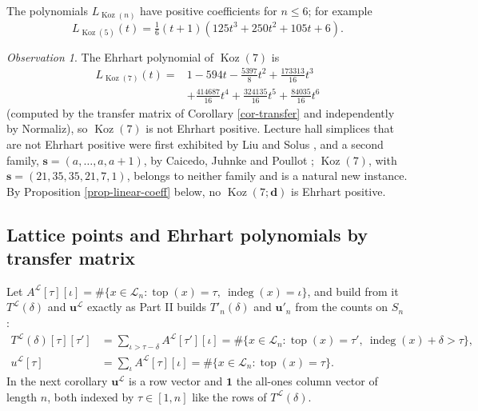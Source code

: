 \documentclass[11pt, a4paper, abstract=yes]{scrartcl}
\theoremstyle{definition}
\theoremstyle{remark}
\theoremstyle{plain}
\newcommand{\vek}[1]{\boldsymbol{#1}}
\theoremstyle{remark}
\newtheorem{observation}[definition]{Observation}
\theoremstyle{plain}
\newcommand{\Koz}{\operatorname{Koz}}
\newcommand{\indeg}{\operatorname{indeg}}
\newcommand{\tp}{\operatorname{top}}
\let\autocite\cite
\begin{document}
The polynomials \(L_{\Koz(n)}\) have positive coefficients for \(n\le6\); for example
\[
  L_{\Koz(5)}(t)=\tfrac16(t+1)(125t^3+250t^2+105t+6).
\]

\begin{observation}
The Ehrhart polynomial of \(\Koz(7)\) is
\begin{equation*}
\begin{split}
  L_{\Koz(7)}(t)={}&1-594t-\tfrac{5397}8t^2+\tfrac{173313}{16}t^3\\
  &+\tfrac{414687}{16}t^4+\tfrac{324135}{16}t^5+\tfrac{84035}{16}t^6
\end{split}
\end{equation*}
(computed by the transfer matrix of Corollary \ref{cor-transfer} and independently by Normaliz), so
\(\Koz(7)\) is not Ehrhart positive. Lecture hall simplices that are not Ehrhart positive were first exhibited by Liu and Solus
\autocite[Theorem 4.3]{LiuSolus2019}, and a second family, \(\vek s=(a,\dots,a,a+1)\), by Caicedo,
Juhnke and Poullot \autocite[Theorem 3.5]{CaicedoJuhnkePoullot2025}; \(\Koz(7)\), with
\(\vek s=(21,35,35,21,7,1)\), belongs to neither family and is a natural new instance. By
Proposition \ref{prop-linear-coeff} below, no \(\Koz(7;\vek d)\) is Ehrhart positive.
\label{obs-positivity}
\end{observation}
\subsection{Lattice points and Ehrhart polynomials by transfer matrix}
\label{sec:org87e83bc}

Let \(A^{\mathcal L}[\tau][\iota]=\#\lbrace x\in\mathcal L_n:\tp(x)=\tau,\ \indeg(x)=\iota\rbrace\), and
build from it \(T^{\mathcal L}(\delta)\) and \(\vek u^{\mathcal L}\) exactly as Part II builds
\(T'_n(\delta)\) and \(\vek u'_n\) from the counts on \(S_n\)
\autocite[Definition 28 and Theorem 41]{SnellmanArticle2}:
\begin{equation}\label{eq:transfer}
\begin{aligned}
  T^{\mathcal L}(\delta)[\tau][\tau']&=\sum_{\iota>\tau-\delta}A^{\mathcal L}[\tau'][\iota]
  =\#\lbrace x\in\mathcal L_n:\tp(x)=\tau',\ \indeg(x)+\delta>\tau\rbrace,\\
  u^{\mathcal L}[\tau]&=\sum_\iota A^{\mathcal L}[\tau][\iota]=\#\lbrace x\in\mathcal L_n:\tp(x)=\tau\rbrace .
\end{aligned}
\end{equation}
In the next corollary \(\vek u^{\mathcal L}\) is a row vector and \(\vek 1\) the all-ones column vector
of length \(n\), both indexed by \(\tau\in[1,n]\) like the rows of \(T^{\mathcal L}(\delta)\).
\end{document}
